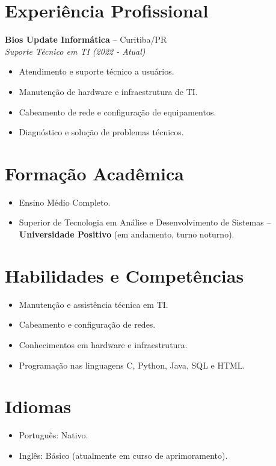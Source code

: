 \documentclass[a4paper,12pt]{article}
\begin{document}
\section{Experiência Profissional}
\textbf{Bios Update Informática} – Curitiba/PR \\
\textit{Suporte Técnico em TI (2022 - Atual)}

\begin{itemize}
  \item Atendimento e suporte técnico a usuários.
  \item Manutenção de hardware e infraestrutura de TI.
  \item Cabeamento de rede e configuração de equipamentos.
  \item Diagnóstico e solução de problemas técnicos.
\end{itemize}

\section{Formação Acadêmica}
\begin{itemize}
  \item Ensino Médio Completo.
  \item Superior de Tecnologia em Análise e Desenvolvimento de Sistemas – \textbf{Universidade Positivo} (em andamento, turno noturno).
\end{itemize}

\section{Habilidades e Competências}
\begin{itemize}
  \item Manutenção e assistência técnica em TI.
  \item Cabeamento e configuração de redes.
  \item Conhecimentos em hardware e infraestrutura.
  \item Programação nas linguagens C, Python, Java, SQL e HTML.
\end{itemize}

\section{Idiomas}
\begin{itemize}
  \item Português: Nativo.
  \item Inglês: Básico (atualmente em curso de aprimoramento).
\end{itemize}
\end{document}
